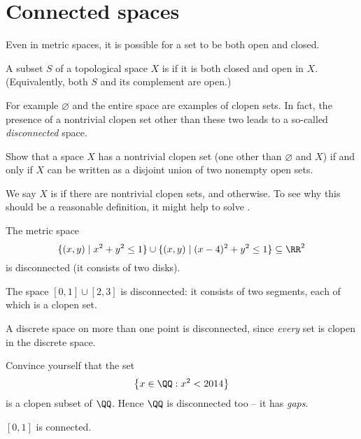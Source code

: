 \section{Connected spaces}
Even in metric spaces, it is possible for a set
to be both open and closed.
\begin{definition}
	A subset $S$ of a topological space $X$
	is  if it is both closed and open in $X$.
	(Equivalently, both $S$ and its complement are open.)
\end{definition}
For example $\varnothing$ and the entire space are examples of clopen sets.
In fact, the presence of a nontrivial clopen set other
than these two leads to a so-called \emph{disconnected} space.

\begin{ques}
	Show that a space $X$ has a nontrivial clopen set
	(one other than $\varnothing$ and $X$)
	if and only if $X$ can be written as a disjoint union
	of two nonempty open sets.
\end{ques}

We say $X$ is 
if there are nontrivial clopen sets,
and  otherwise.
To see why this should be a reasonable definition,
it might help to solve .

\begin{example}
	\listhack
	\begin{enumerate}[(a)]
		\ii The metric space
		\[ \{ (x,y) \mid x^2+y^2\le 1 \}
			\cup \{ (x,y) \mid (x-4)^2+y^2\le1\} \subseteq \RR^2 \]
		is disconnected (it consists of two disks).

		\ii The space $[0,1] \cup [2,3]$ is disconnected:
		it consists of two segments,
		each of which is a clopen set.

		\ii A discrete space on more than one point is disconnected,
		since \emph{every} set is clopen in the discrete space.

		\ii Convince yourself that the set
		\[ \left\{ x \in \QQ : x^2 < 2014 \right\} \]
		is a clopen subset of $\QQ$.
		Hence $\QQ$ is disconnected too -- it has \emph{gaps}.

		\ii $[0,1]$ is connected.
	\end{enumerate}
\end{example}




